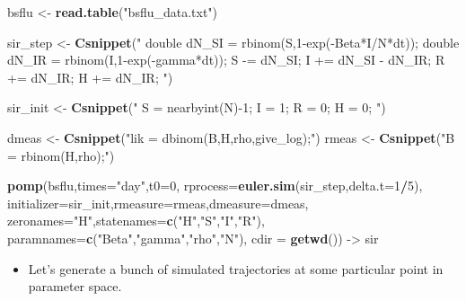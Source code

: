 \documentclass[]{article}
\newenvironment{Shaded}{\begin{snugshade}}{\end{snugshade}}
\newcommand{\KeywordTok}[1]{\textcolor[rgb]{0.13,0.29,0.53}{\textbf{#1}}}
\newcommand{\DataTypeTok}[1]{\textcolor[rgb]{0.13,0.29,0.53}{#1}}
\newcommand{\DecValTok}[1]{\textcolor[rgb]{0.00,0.00,0.81}{#1}}
\newcommand{\StringTok}[1]{\textcolor[rgb]{0.31,0.60,0.02}{#1}}
\newcommand{\OperatorTok}[1]{\textcolor[rgb]{0.81,0.36,0.00}{\textbf{#1}}}
\newcommand{\NormalTok}[1]{#1}
\providecommand{\tightlist}{%
  \setlength{\itemsep}{0pt}\setlength{\parskip}{0pt}}
\begin{document}
\begin{Shaded}
\begin{Highlighting}[]
\NormalTok{bsflu <-}\StringTok{ }\KeywordTok{read.table}\NormalTok{(}\StringTok{"bsflu_data.txt"}\NormalTok{)}

\NormalTok{sir_step <-}\StringTok{ }\KeywordTok{Csnippet}\NormalTok{(}\StringTok{"}
\StringTok{  double dN_SI = rbinom(S,1-exp(-Beta*I/N*dt));}
\StringTok{  double dN_IR = rbinom(I,1-exp(-gamma*dt));}
\StringTok{  S -= dN_SI;}
\StringTok{  I += dN_SI - dN_IR;}
\StringTok{  R += dN_IR;}
\StringTok{  H += dN_IR;}
\StringTok{"}\NormalTok{)}

\NormalTok{sir_init <-}\StringTok{ }\KeywordTok{Csnippet}\NormalTok{(}\StringTok{"}
\StringTok{  S = nearbyint(N)-1;}
\StringTok{  I = 1;}
\StringTok{  R = 0;}
\StringTok{  H = 0;}
\StringTok{"}\NormalTok{)}

\NormalTok{dmeas <-}\StringTok{ }\KeywordTok{Csnippet}\NormalTok{(}\StringTok{"lik = dbinom(B,H,rho,give_log);"}\NormalTok{)}
\NormalTok{rmeas <-}\StringTok{ }\KeywordTok{Csnippet}\NormalTok{(}\StringTok{"B = rbinom(H,rho);"}\NormalTok{)}

\KeywordTok{pomp}\NormalTok{(bsflu,}\DataTypeTok{times=}\StringTok{"day"}\NormalTok{,}\DataTypeTok{t0=}\DecValTok{0}\NormalTok{,}
     \DataTypeTok{rprocess=}\KeywordTok{euler.sim}\NormalTok{(sir_step,}\DataTypeTok{delta.t=}\DecValTok{1}\OperatorTok{/}\DecValTok{5}\NormalTok{),}
     \DataTypeTok{initializer=}\NormalTok{sir_init,}\DataTypeTok{rmeasure=}\NormalTok{rmeas,}\DataTypeTok{dmeasure=}\NormalTok{dmeas,}
     \DataTypeTok{zeronames=}\StringTok{"H"}\NormalTok{,}\DataTypeTok{statenames=}\KeywordTok{c}\NormalTok{(}\StringTok{"H"}\NormalTok{,}\StringTok{"S"}\NormalTok{,}\StringTok{"I"}\NormalTok{,}\StringTok{"R"}\NormalTok{),}
     \DataTypeTok{paramnames=}\KeywordTok{c}\NormalTok{(}\StringTok{"Beta"}\NormalTok{,}\StringTok{"gamma"}\NormalTok{,}\StringTok{"rho"}\NormalTok{,}\StringTok{"N"}\NormalTok{),}
     \DataTypeTok{cdir =} \KeywordTok{getwd}\NormalTok{()) ->}\StringTok{ }\NormalTok{sir}
\end{Highlighting}
\end{Shaded}

\begin{itemize}
\tightlist
\item
  Let's generate a bunch of simulated trajectories at some particular
  point in parameter space.
\end{itemize}
\end{document}
